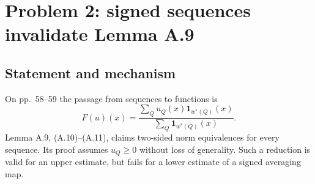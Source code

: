 \documentclass[10pt]{article}
\begin{document}
\section*{Problem 2: signed sequences invalidate Lemma A.9}
\subsection*{Statement and mechanism}
On pp. 58–59 the passage from sequences to functions is \[F(u)(x)=\frac{\sum_Q u_Q(x)\mathbf1_{w^*(Q)}(x)}
                   {\sum_Q\mathbf1_{w^*(Q)}(x)}.\] Lemma A.9, (A.10)–(A.11), claims two-sided norm equivalences for every sequence. Its proof assumes \(u_Q\geq0\) without loss of generality. Such a reduction is valid for an upper estimate, but fails for a lower estimate of a signed averaging map.\par
\end{document}

